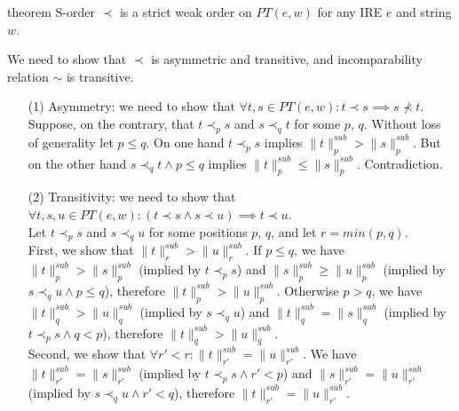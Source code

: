 \documentclass[AMA,STIX1COL]{WileyNJD-v2}
\newcommand{\PT}{PT}
\newcommand{\snorm}[2]{\|{#1}\|^{sub}_{#2}}
\begin{document}
\begin{theoremEnd}[restate, no link to proof, no link to theorem, category=theorem_sorder_on_PTs]{theorem}
    \label{theorem_sorder_on_PTs}
    S-order $\prec$ is a strict weak order on $\PT(e, w)$ for any IRE $e$ and string $w$.
\end{theoremEnd}
\begin{proofEnd}
    We need to show that $\prec$ is asymmetric and transitive, and incomparability relation $\sim$ is transitive.
    \begin{itemize}[itemsep=0.5em, topsep=0.5em]
        \item[(1)]
            Asymmetry: we need to show that $\forall t, s \in \PT(e,w): t \prec s \implies s \not\prec t$.
            \\[0.5em]
            Suppose, on the contrary, that $t \prec_p s$ and $s \prec_q t$ for some $p$, $q$.
            Without loss of generality let $p \leq q$.
            On one hand $t \prec_p s$ implies $\snorm{t}{p} > \snorm{s}{p}$.
            But on the other hand $s \prec_q t \wedge p \leq q$ implies $\snorm{t}{p} \leq \snorm{s}{p}$.
            Contradiction.

        \item[(2)]
            Transitivity: we need to show that $\forall t, s, u \in \PT(e,w): (t \prec s \wedge s \prec u) \implies t \prec u$.
            \\[0.5em]
            Let $t \prec_p s$ and $s \prec_q u$ for some positions $p$, $q$, and let $r = min (p, q)$.
            \\[0.5em]
            First, we show that $\snorm{t}{r} > \snorm{u}{r}$.
            If $p \leq q$, we have $\snorm{t}{p} > \snorm{s}{p}$ (implied by $t \prec_p s$)
            and $\snorm{s}{p} \geq \snorm{u}{p}$ (implied by $s \prec_q u \wedge p \leq q$),
            therefore $\snorm{t}{p} > \snorm{u}{p}$.
            Otherwise $p > q$, we have $\snorm{t}{q} > \snorm{u}{q}$ (implied by $s \prec_q u$)
            and $\snorm{t}{q} = \snorm{s}{q}$ (implied by $t \prec_p s \wedge q < p$),
            therefore $\snorm{t}{q} > \snorm{u}{q}$.
            \\[0.5em]
            Second, we show that $\forall r' < r : \snorm{t}{r'} = \snorm{u}{r'}$.
            We have $\snorm{t}{r'} = \snorm{s}{r'}$ (implied by $t \prec_p s \wedge r' < p$)
            and $\snorm{s}{r'} = \snorm{u}{r'}$ (implied by $s \prec_q u \wedge r' < q$),
            therefore $\snorm{t}{r'} = \snorm{u}{r'}$.


\end{itemize}
\end{proofEnd}
\end{document}
